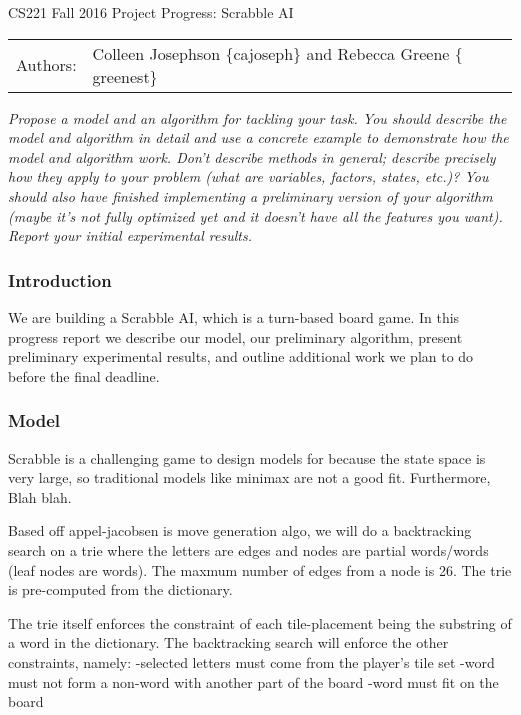 \documentclass[12pt]{article}
\begin{document}
\begin{center}
{\Large CS221 Fall 2016 Project Progress: Scrabble AI}

\begin{tabular}{rl}
  Authors: & Colleen Josephson $\{$cajoseph$\}$ and Rebecca Greene $\{$greenest$\}$\\
\end{tabular}
\end{center}

\emph{Propose a model and an algorithm for tackling your task. You should
describe the model and algorithm in detail and use a concrete example
to demonstrate how the model and algorithm work. Don't describe
methods in general; describe precisely how they apply to your problem
(what are variables, factors, states, etc.)? You should also have
finished implementing a preliminary version of your algorithm (maybe
it's not fully optimized yet and it doesn't have all the features you
want). Report your initial experimental results.}


\subsubsection*{Introduction}
We are building a Scrabble AI, which is a turn-based board game. In
this progress report we describe our model, our preliminary algorithm,
present preliminary experimental results, and outline additional work
we plan to do before the final deadline.

\subsubsection*{Model}
Scrabble is a challenging game to design models for because the state
space is very large, so traditional models like minimax are not a good
fit. Furthermore, Blah blah.

Based off appel-jacobsen is move generation algo, we will do a
backtracking search on a trie where the letters are edges and nodes
are partial words/words (leaf nodes are words). The maxmum number of
edges from a node is 26. The trie is pre-computed from the dictionary.

The trie itself enforces the constraint of each tile-placement being
the substring of a word in the dictionary. The backtracking search
will enforce the other constraints, namely:
-selected letters must come from the player's tile set
-word must not form a non-word with another part of the board
-word must fit on the board
\end{document}
